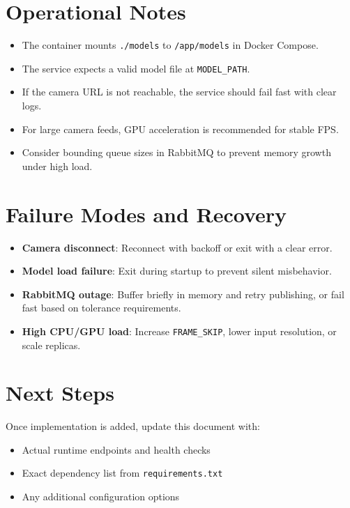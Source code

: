 \documentclass[11pt]{article}
\begin{document}
\section{Operational Notes}
\begin{itemize}
  \item The container mounts \texttt{./models} to \texttt{/app/models} in Docker Compose.
  \item The service expects a valid model file at \texttt{MODEL\_PATH}.
  \item If the camera URL is not reachable, the service should fail fast with clear logs.
  \item For large camera feeds, GPU acceleration is recommended for stable FPS.
  \item Consider bounding queue sizes in RabbitMQ to prevent memory growth under high load.
\end{itemize}

\section{Failure Modes and Recovery}
\begin{itemize}
  \item \textbf{Camera disconnect}: Reconnect with backoff or exit with a clear error.
  \item \textbf{Model load failure}: Exit during startup to prevent silent misbehavior.
  \item \textbf{RabbitMQ outage}: Buffer briefly in memory and retry publishing, or fail fast based on tolerance requirements.
  \item \textbf{High CPU/GPU load}: Increase \texttt{FRAME\_SKIP}, lower input resolution, or scale replicas.
\end{itemize}

\section{Next Steps}
Once implementation is added, update this document with:
\begin{itemize}
  \item Actual runtime endpoints and health checks
  \item Exact dependency list from \texttt{requirements.txt}
  \item Any additional configuration options
\end{itemize}
\end{document}
